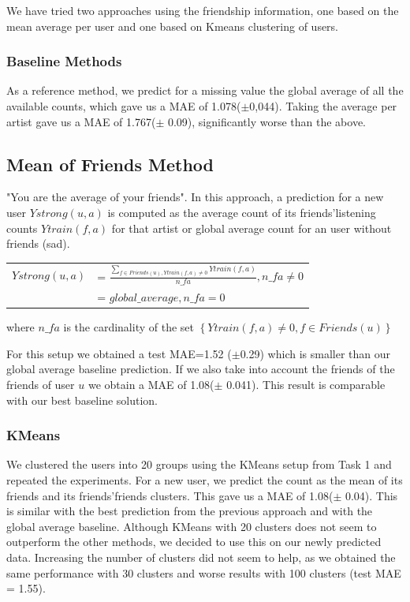 We have tried two approaches using the friendship information, one based on the mean average per user and one based on Kmeans clustering of users.

\subsubsection{Baseline Methods}
As a reference method, we predict for a missing value the global average of all the available counts, which gave us a MAE of 1.078($\pm$0,044). Taking the average per artist gave us a MAE of 1.767($\pm$  0.09), significantly worse than the above.

\subsection{Mean of Friends Method}
 "You are the average of your friends". In this approach, a prediction for a new user $Ystrong(u,a)$ is computed as the average count of its friends'listening counts $Ytrain(f,a)$ for that artist or global average count for an user without friends (sad).

\begin{table}[h]
  \centering
  \begin{tabular}{ c  l }
  $Ystrong(u,a) $&= $\frac{\sum_{f\in Friends(u), Ytrain(f,a)\neq0}{Ytrain(f,a)}}{n\_fa}, n\_fa \neq 0$ \\ 
                          &= $global\_average, n\_fa = 0$ \\ 
  \end{tabular}
\end{table}
where $n\_fa$ is the cardinality of the set $\left\{ Ytrain(f,a)\neq0, f\in Friends(u)\right\}$

For this setup  we obtained a test MAE=1.52 ($\pm$0.29) which is smaller than our global average baseline prediction.
If we also take into account the friends of the friends of user $u$ we obtain  a MAE of 1.08($\pm$ 0.041). This result is comparable with our best baseline solution.

\subsubsection{KMeans}
We clustered the users into 20 groups using the KMeans setup from Task 1
and repeated the experiments. For a new user,  we predict the count as the mean of its friends and its friends'friends clusters. This gave us a MAE of
1.08($\pm$ 0.04). This is similar with the best prediction from the previous approach and with the  global average baseline. Although KMeans with 20 clusters does not seem to outperform the other methods, we decided to use this on our newly predicted data.
Increasing the number of clusters did not seem to help, as we obtained the same performance with 30 clusters and worse results with 100 clusters (test MAE = 1.55). 
 
